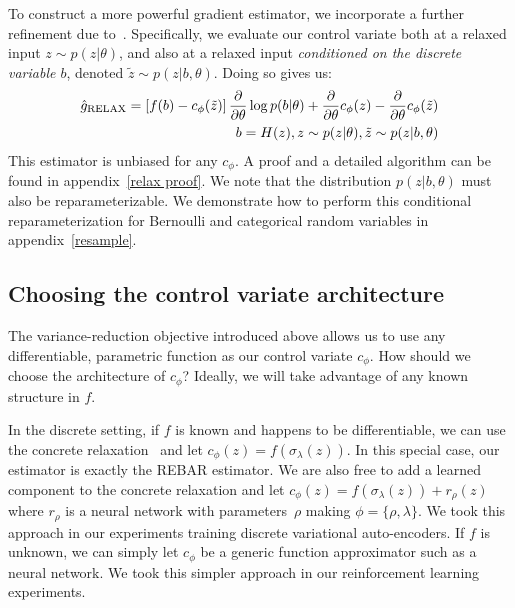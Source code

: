 \documentclass{article}
\newcommand{\PT}{\frac{\partial}{\partial \theta}}
\begin{document}

To construct a more powerful gradient estimator, we incorporate a further refinement due to~\cite{tucker2017rebar}.
Specifically, we evaluate our control variate both at a relaxed input $z \sim p(z|\theta)$, and also at a relaxed input \emph{conditioned on the discrete variable $b$}, denoted $\tilde z \sim p(z|b, \theta)$. 
Doing so gives us:
%
\begin{align}
\hat g_\textnormal{RELAX} = \left[ f(b) - c_\phi(\tilde{z}) \right] \PT \log p(b|\theta) + \PT c_\phi(z) - \PT c_\phi (\tilde{z}) \\
\qquad b = H(z), z \sim p(z|\theta), \tilde{z} \sim p(z|b, \theta) \nonumber
\end{align}
%
This estimator is unbiased for any $c_\phi$.
A proof and a detailed algorithm can be found in appendix~\ref{relax proof}.
%
We note that the distribution $p(z|b,\theta)$ must also be reparameterizable.
We demonstrate how to perform this conditional reparameterization for Bernoulli and categorical random variables in appendix~\ref{resample}.

\subsection{Choosing the control variate architecture}
The variance-reduction objective introduced above allows us to use any differentiable, parametric function as our control variate $c_\phi$. 
How should we choose the architecture of $c_\phi$?
Ideally, we will take advantage of any known structure in $f$.

In the discrete setting, if $f$ is known and happens to be differentiable, we can use the concrete relaxation~\citep{jang2016categorical, maddison2016concrete} and let $c_\phi(z) = f(\sigma_\lambda(z))$.
In this special case, our estimator is exactly the REBAR estimator.
We are also free to add a learned component to the concrete relaxation and let $c_\phi(z) = f(\sigma_\lambda(z)) + {r}_\rho(z)$ where ${r}_\rho$ is a neural network with parameters~$\rho$ making $\phi = \{\rho, \lambda\}$.
We took this approach in our experiments training discrete variational auto-encoders.
If $f$ is unknown, we can simply let $c_\phi$ be a generic function approximator such as a neural network.
We took this simpler approach in our reinforcement learning experiments.
\end{document}
